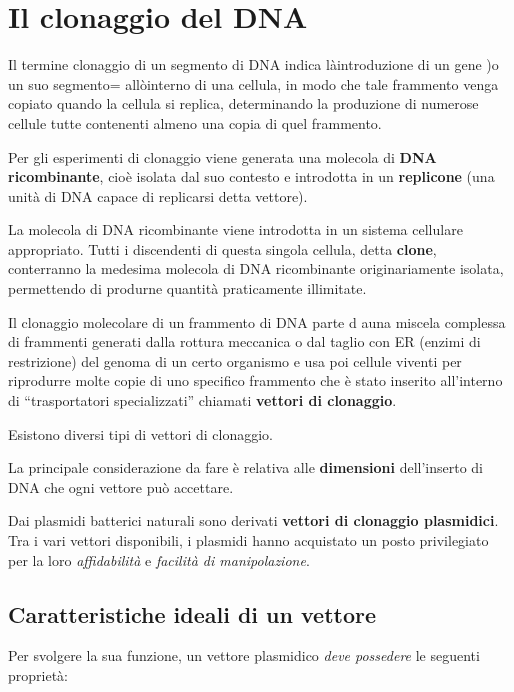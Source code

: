 \documentclass[]{article}
\date{}
\begin{document}
\section{Il clonaggio del DNA}\label{il-clonaggio-del-dna}

Il termine clonaggio di un segmento di DNA indica làintroduzione di un
gene )o un suo segmento= allòinterno di una cellula, in modo che tale
frammento venga copiato quando la cellula si replica, determinando la
produzione di numerose cellule tutte contenenti almeno una copia di quel
frammento.

Per gli esperimenti di clonaggio viene generata una molecola di
\textbf{DNA ricombinante}, cioè isolata dal suo contesto e introdotta in
un \textbf{replicone} (una unità di DNA capace di replicarsi detta
vettore).

La molecola di DNA ricombinante viene introdotta in un sistema cellulare
appropriato. Tutti i discendenti di questa singola cellula, detta
\textbf{clone}, conterranno la medesima molecola di DNA ricombinante
originariamente isolata, permettendo di produrne quantità praticamente
illimitate.

Il clonaggio molecolare di un frammento di DNA parte d auna miscela
complessa di frammenti generati dalla rottura meccanica o dal taglio con
ER (enzimi di restrizione) del genoma di un certo organismo e usa poi
cellule viventi per riprodurre molte copie di uno specifico frammento
che è stato inserito all'interno di ``trasportatori specializzati''
chiamati \textbf{vettori di clonaggio}.

Esistono diversi tipi di vettori di clonaggio.

La principale considerazione da fare è relativa alle \textbf{dimensioni}
dell'inserto di DNA che ogni vettore può accettare.

Dai plasmidi batterici naturali sono derivati \textbf{vettori di
clonaggio plasmidici}. Tra i vari vettori disponibili, i plasmidi hanno
acquistato un posto privilegiato per la loro \emph{affidabilità} e
\emph{facilità di manipolazione}.

\subsection{Caratteristiche ideali di un
vettore}\label{caratteristiche-ideali-di-un-vettore}

Per svolgere la sua funzione, un vettore plasmidico \emph{deve
possedere} le seguenti proprietà:
\end{document}
